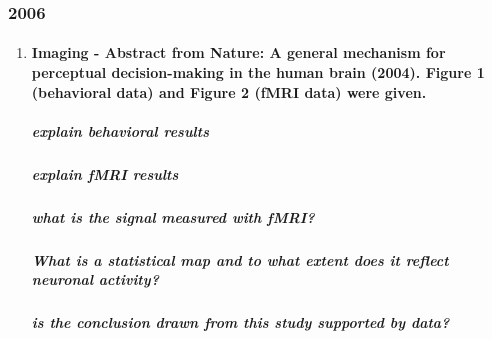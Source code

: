 \documentclass[12pt,article,oneside,a4paper]{memoir}
\begin{document}
\subsubsection{2006}
\begin{enumerate}
\item \paragraph{Imaging - Abstract from Nature: A general mechanism for perceptual decision-making in the human brain (2004). Figure 1 (behavioral data) and Figure 2 (fMRI data) were given.}
\subparagraph{explain behavioral results}
\subparagraph{explain fMRI results}
\subparagraph{what is the signal measured with fMRI?}
\subparagraph{What is a statistical map and to what extent does it reflect neuronal activity?}
\subparagraph{is the conclusion drawn from this study supported by data?}


\end{enumerate}
\end{document}
